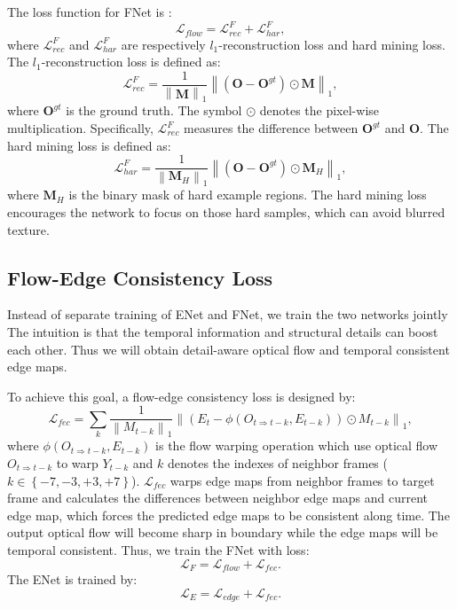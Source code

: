 The loss function for FNet is :
\begin{equation}
	\label{eq:flow_all}
	\mathcal{L}_{flow}=\mathcal{L}^F_{rec}+\mathcal{L}^F_{har},
\end{equation}
where $\mathcal{L}^F_{rec}$ and $\mathcal{L}^F_{har}$ are respectively $l_1$-reconstruction loss and hard mining loss.
The $l_1$-reconstruction loss is defined as:
\begin{equation}
	\label{eq:flow_l1}
	\mathcal{L}^F_{rec}=\frac{1}{\left\|\boldsymbol{M} \right\|_1}\left\|(\boldsymbol{O}-\boldsymbol{O}^{gt})\odot \boldsymbol{M}\right\|_1,
\end{equation}
where $\boldsymbol{O}^{gt}$ is the ground truth. The symbol $\odot$ denotes the pixel-wise multiplication. Specifically, $\mathcal{L}^F_{rec}$ measures the difference between $\boldsymbol{O}^{gt}$ and $\boldsymbol{O}$.
The hard mining loss is defined as:
\begin{equation}
	\label{eq:flow_hard}
	\mathcal{L}^F_{har}=\frac{1}{\left\|\boldsymbol{M}_H \right\|_1}\left\|(\boldsymbol{O}-\boldsymbol{O}^{gt})\odot \boldsymbol{M}_H\right\|_1,
\end{equation}
where $\boldsymbol{M}_H$ is the binary mask of hard example regions. 
The hard mining loss encourages the network to focus on those hard samples, which can avoid blurred texture. 

\subsection{Flow-Edge Consistency Loss}
Instead of separate training of ENet and FNet, we train the two networks jointly
The intuition is that the temporal information and structural details can boost each other. Thus we will obtain detail-aware optical flow and temporal consistent edge maps.

To achieve this goal, a flow-edge consistency loss is designed by:
\begin{equation}
	\label{eq:flow_edge}
	\mathcal{L}_{fec}=\sum_{k}\frac{1}{\left\|M_{t-k} \right\|_1}\left\|(E_{t}-\phi(O_{t\Rightarrow t-k},E_{t-k}))\odot M_{t-k}\right\|_1,
\end{equation}
where 
$\phi(O_{t\Rightarrow t-k},E_{t-k})$ is the flow warping operation which use optical flow $O_{t\Rightarrow t-k}$ to warp $Y_{t-k}$ and $k$ denotes the indexes of neighbor frames ($k\in \left\{-7,-3,+3,+7 \right\}$). 
$\mathcal{L}_{fec}$ warps edge maps from neighbor frames to target frame and calculates the differences between neighbor edge maps and current edge map, which forces the predicted edge maps to be consistent along time.
The output optical flow will become sharp in boundary while the edge maps will be temporal consistent.
Thus, we train the FNet with loss:
\begin{equation}
	\label{eq:flow}
	\mathcal{L}_{F}=\mathcal{L}_{flow}+\mathcal{L}_{fec}.
\end{equation}
The ENet is trained by:
\begin{equation}
	\label{eq:edge}
	\mathcal{L}_{E}=\mathcal{L}_{edge}+\mathcal{L}_{fec}.
\end{equation}






